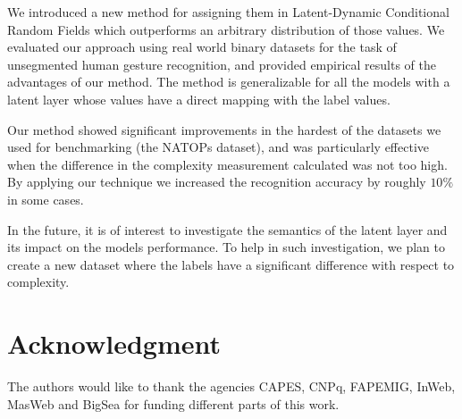 \documentclass[10pt, conference]{IEEEtran}
\begin{document}
We introduced a new method for assigning them in Latent-Dynamic Conditional Random Fields which outperforms an arbitrary distribution of those values. We evaluated our approach using real world binary datasets for the task of unsegmented human gesture recognition, and provided empirical results of the advantages of our method. The method is generalizable for all the models with a latent layer whose values have a direct mapping with the label values.

Our method showed significant improvements in the hardest of the datasets we used for benchmarking (the NATOPs dataset), and was particularly effective when the difference in the complexity measurement calculated was not too high.  By applying our technique we increased the recognition accuracy by roughly $10\%$ in some cases.

In the future, it is of interest to investigate the semantics of the latent layer and its impact on the models performance. To help in such investigation, we plan to create a new dataset where the labels have a significant difference with respect to complexity.

\iffinal
\section*{Acknowledgment}

The authors would like to thank the agencies CAPES, CNPq, FAPEMIG, InWeb, MasWeb and BigSea for funding different parts of this work. 
\fi




\end{document}
